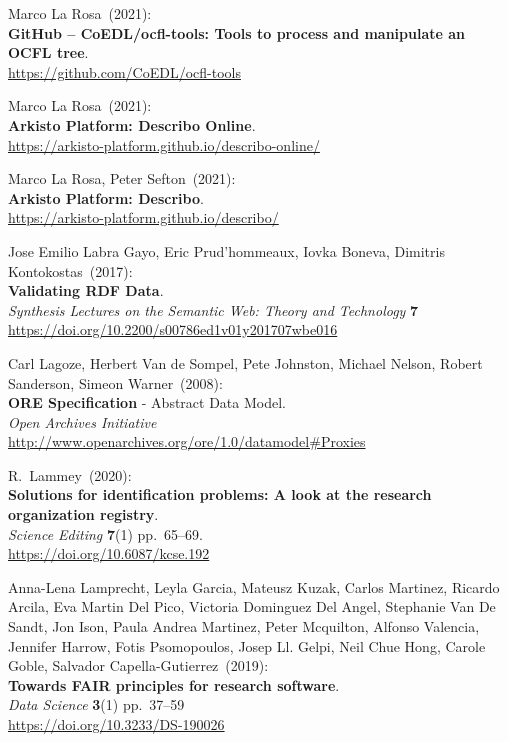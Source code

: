 \begin{thebibliography}{9}
Marco La Rosa~(2021): \\
\textbf{GitHub -- CoEDL/ocfl-tools: Tools to process and manipulate an OCFL tree}.\\
\url{https://github.com/CoEDL/ocfl-tools}

Marco La Rosa~(2021): \\
\textbf{Arkisto Platform: Describo Online}.\\
\url{https://arkisto-platform.github.io/describo-online/}

Marco La Rosa, Peter Sefton~(2021): \\
\textbf{Arkisto Platform: Describo}.\\
\url{https://arkisto-platform.github.io/describo/}

Jose Emilio Labra Gayo, Eric Prud'hommeaux, Iovka Boneva, Dimitris
Kontokostas~(2017): \\
\textbf{Validating {RDF Data}}. \\
\emph{Synthesis Lectures on the Semantic Web: Theory and Technology} \textbf{7} \\
\url{https://doi.org/10.2200/s00786ed1v01y201707wbe016}

Carl Lagoze, 
Herbert Van de Sompel, 
Pete Johnston, 
Michael Nelson, 
Robert Sanderson, 
Simeon Warner~(2008): \\
\textbf{ORE Specification} - {Abstract Data Model}. \\
\emph{Open Archives Initiative}\\
\url{http://www.openarchives.org/ore/1.0/datamodel#Proxies} 

R.~Lammey~(2020): \\
\textbf{Solutions for identification problems: A look at the research
organization registry}.\\
\emph{Science Editing} \textbf{7}(1) pp.~65--69.\\
\url{https://doi.org/10.6087/kcse.192}

Anna-Lena Lamprecht, Leyla Garcia, Mateusz Kuzak, Carlos
Martinez, Ricardo Arcila, Eva Martin Del Pico, Victoria Dominguez Del
Angel, Stephanie Van De Sandt, Jon Ison, Paula Andrea Martinez, Peter
Mcquilton, Alfonso Valencia, Jennifer Harrow, Fotis Psomopoulos, Josep
Ll. Gelpi, Neil Chue Hong, Carole Goble, Salvador Capella-Gutierrez~(2019): \\
\textbf{Towards FAIR principles for research software}.\\
\emph{Data Science} \textbf{3}(1) pp.~37--59\\
\url{https://doi.org/10.3233/DS-190026}


\end{thebibliography}
